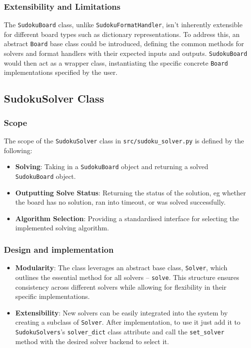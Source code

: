 \documentclass[11pt]{article}
\begin{document}
\subsubsection{Extensibility and Limitations}
The \texttt{SudokuBoard} class, unlike \texttt{SudokuFormatHandler}, isn't inherently extensible for different board types such as dictionary representations. To address this, an abstract \texttt{Board} base class could be introduced, defining the common methods for solvers and format handlers with their expected inputs and outputs. \texttt{SudokuBoard} would then act as a wrapper class, instantiating the specific concrete \texttt{Board} implementations specified by the user.


\subsection{SudokuSolver Class}
\subsubsection{Scope}
The scope of the \texttt{SudokuSolver} class in \texttt{src/sudoku\_solver.py} is defined by the following:
\begin{itemize}
    \item \textbf{Solving}: Taking in a \texttt{SudokuBoard} object and returning a solved \texttt{SudokuBoard} object.
    \item \textbf{Outputting Solve Status}: Returning the status of the solution, eg whether the board has no solution, ran into timeout, or was solved successfully.
    \item \textbf{Algorithm Selection}: Providing a standardised interface for selecting the implemented solving algorithm.
\end{itemize}
\subsubsection{Design and implementation}
\begin{itemize}
    \item \textbf{Modularity}: The class leverages an abstract base class, \texttt{Solver}, which outlines the essential method for all solvers -- \texttt{solve}. This structure ensures consistency across different solvers while allowing for flexibility in their specific implementations.
    \item \textbf{Extensibility}: New solvers can be easily integrated into the system by creating a subclass of \texttt{Solver}. After implementation, to use it just add it to \texttt{SudokuSolvers}'s \texttt{solver\_dict} class attribute and call the \texttt{set\_solver} method with the desired solver backend to select it.
\end{itemize}
\end{document}
